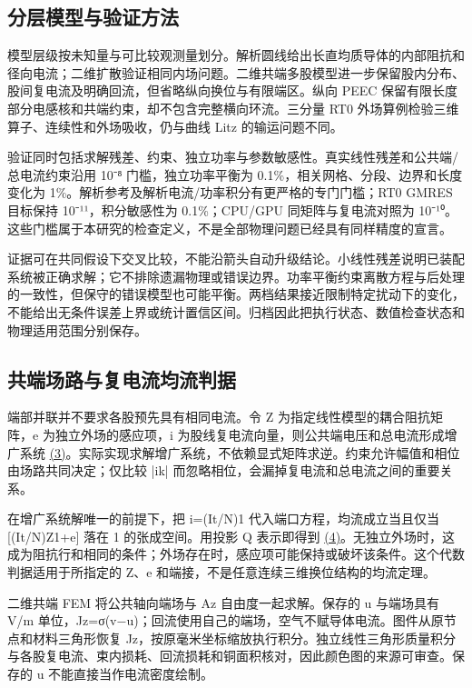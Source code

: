 \documentclass[journal,10pt]{IEEEtran}
\begin{document}
\subsection*{分层模型与验证方法}
\hypertarget{02.hierarchy.heading}{}
模型层级按未知量与可比较观测量划分。解析圆线给出长直均质导体的内部阻抗和径向电流；二维扩散验证相同内场问题。二维共端多股模型进一步保留股内分布、股间复电流及明确回流，但省略纵向换位与有限端区。纵向 PEEC 保留有限长度部分电感核和共端约束，却不包含完整横向环流。三分量 RT0 外场算例检验三维算子、连续性和外场吸收，仍与曲线 Litz 的输运问题不同。


验证同时包括求解残差、约束、独立功率与参数敏感性。真实线性残差和公共端/总电流约束沿用 10⁻⁸ 门槛，独立功率平衡为 0.1\%，相关网格、分段、边界和长度变化为 1\%。解析参考及解析电流/功率积分有更严格的专门门槛；RT0 GMRES 目标保持 10⁻¹¹，积分敏感性为 0.1\%；CPU/GPU 同矩阵与复电流对照为 10⁻¹⁰。这些门槛属于本研究的检查定义，不是全部物理问题已经具有同样精度的宣言。


证据可在共同假设下交叉比较，不能沿箭头自动升级结论。小线性残差说明已装配系统被正确求解；它不排除遗漏物理或错误边界。功率平衡约束离散方程与后处理的一致性，但保守的错误模型也可能平衡。两档结果接近限制特定扰动下的变化，不能给出无条件误差上界或统计置信区间。归档因此把执行状态、数值检查状态和物理适用范围分别保存。


\subsection*{共端场路与复电流均流判据}
\hypertarget{02.common.heading}{}
端部并联并不要求各股预先具有相同电流。令 Z 为指定线性模型的耦合阻抗矩阵，e 为独立外场的感应项，i 为股线复电流向量，则公共端电压和总电流形成增广系统 \href{paper_zh-CN_ieee.pdf#E04}{(3)}。实际实现求解增广系统，不依赖显式矩阵求逆。约束允许幅值和相位由场路共同决定；仅比较 |ik| 而忽略相位，会漏掉复电流和总电流之间的重要关系。


在增广系统解唯一的前提下，把 i=(It/N)1 代入端口方程，均流成立当且仅当 [(It/N)Z1+e] 落在 1 的张成空间。用投影 Q 表示即得到 \href{paper_zh-CN_ieee.pdf#E05}{(4)}。无独立外场时，这成为阻抗行和相同的条件；外场存在时，感应项可能保持或破坏该条件。这个代数判据适用于所指定的 Z、e 和端接，不是任意连续三维换位结构的均流定理。


二维共端 FEM 将公共轴向端场与 Az 自由度一起求解。保存的 u 与端场具有 V/m 单位，Jz=σ(v−u)；回流使用自己的端场，空气不赋导体电流。图件从原节点和材料三角形恢复 Jz，按原毫米坐标缩放执行积分。独立线性三角形质量积分与各股复电流、束内损耗、回流损耗和铜面积核对，因此颜色图的来源可审查。保存的 u 不能直接当作电流密度绘制。
\end{document}

